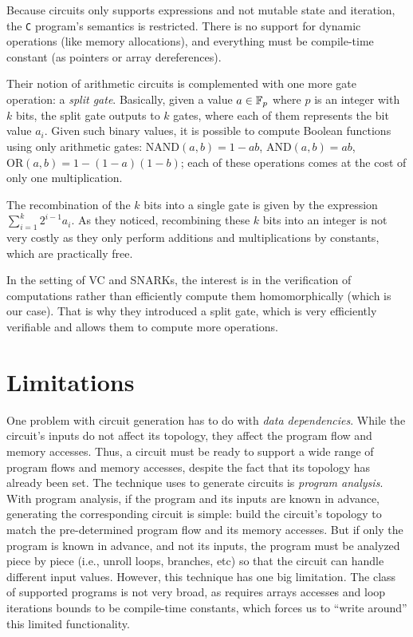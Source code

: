 Because circuits only supports expressions and not mutable state and
iteration, the \texttt{C} program's semantics is restricted. There is no
support for dynamic operations (like memory allocations), and everything must
be compile-time constant (as pointers or array dereferences).

Their notion of arithmetic circuits is complemented with one more gate
operation: a \emph{split gate}. Basically, given a value $a \in \mathbb{F}_p$ where
$p$ is an integer with $k$ bits, the split gate outputs to $k$ gates, where
each of them represents the bit value $a_i$. Given such
binary values, it is possible to compute Boolean functions using only
arithmetic gates: $\mathrm{NAND}(a,b) = 1 - ab$, $\mathrm{AND}(a,b) = ab$,
$\mathrm{OR}(a,b) = 1 - (1 - a)(1 - b)$; each of these operations comes at the
cost of only one multiplication.

The recombination of the $k$ bits into a single gate is given by the expression
$\sum_{i=1}^{k}{2^{i - 1}a_i}$. As they noticed, recombining these $k$ bits
into an integer is not very costly as they only perform additions and
multiplications by constants, which are practically free.

In the setting of VC and SNARKs\footnotemark, the interest is in the
verification of computations rather than efficiently compute them
homomorphically (which is our case). That is why they introduced a split gate,
which is very efficiently verifiable and allows them to compute more
operations.  

\section{Limitations}
One problem with circuit generation has to do with \emph{data dependencies}.
While the circuit's inputs do not affect its topology, they affect the program
flow and memory accesses. Thus, a circuit must be ready to support a wide range
of program flows and memory accesses, despite the fact that its topology has
already been set. The technique 
uses to generate circuits is \emph{program analysis}.
With program analysis, if the program and its inputs are known in advance,
generating the corresponding circuit is simple: build the circuit's topology to
match the pre-determined program flow and its memory accesses. But if only the
program is known in advance, and not its inputs, the program must be analyzed
piece by piece (i.e., unroll loops, branches, etc) so that the circuit can
handle different input values. However, this technique has one big limitation.
The class of supported programs is not very broad, as
 requires arrays accesses and loop
iterations bounds to be compile-time constants, which forces us to ``write
around'' this limited functionality.

